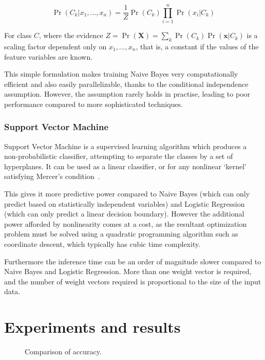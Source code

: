 \documentclass[landscape,twocolumn]{article}
\begin{document}
\begin{equation}
	\label{eq:naivebayes}
	\Pr\left(C_k|x_1,\ldots,x_n\right)=\frac{1}{Z}\Pr\left(C_k\right)\prod_{i=1}^n{\Pr\left(x_i|C_k\right)}
\end{equation}

For class $C$, where the evidence $Z=\Pr\left(\textbf{X}\right)=\sum_k{\Pr\left(C_k\right)\Pr\left(\textbf{x}|C_k\right)}$ is a scaling factor dependent only on $x_1,\ldots,x_n$, that is, a constant if the values of the feature variables are known.

This simple formulation makes training Naive Bayes very computationally efficient and also easily parallelizable, thanks to the conditional independence assumption. However, the assumption rarely holds in practise, leading to poor performance compared to more sophisticated techniques.

\subsubsection{Support Vector Machine}
Support Vector Machine is a supervised learning algorithm which produces a non-probabilistic classifier, attempting to separate the classes by a set of hyperplanes. It can be used as a linear classifier, or for any nonlinear `kernel' satisfying Mercer's condition~\cite{noble2006support}.

This gives it more predictive power compared to Naive Bayes (which can only predict based on statistically independent variables) and Logistic Regression (which can only predict a linear decision boundary). However the additional power afforded by nonlinearity comes at a cost, as the resultant optimization problem must be solved using a quadratic programming algorithm such as coordinate descent, which typically has cubic time complexity.

Furthermore the inference time can be an order of magnitude slower compared to Naive Bayes and Logistic Regression. More than one weight vector is required, and the number of weight vectors required is proportional to the size of the input data.

\section{Experiments and results}
\begin{figure}
	\caption{Comparison of accuracy.}\label{fig:accuracy}
\end{figure}
\end{document}
